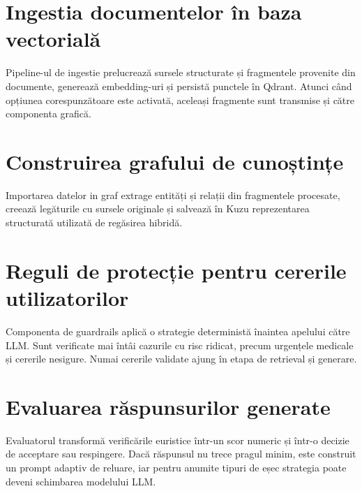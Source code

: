 \documentclass[12pt, a4paper, oneside, romanian]{teza-upb}
\begin{document}
\label{anexa:retrieval-dispatch}


\section{Ingestia documentelor în baza vectorială}

Pipeline-ul de ingestie prelucrează sursele structurate și fragmentele provenite din documente, generează embedding-uri și persistă punctele în Qdrant. Atunci când opțiunea corespunzătoare este activată, aceleași fragmente sunt transmise și către componenta grafică.

\label{anexa:qdrant-ingestion-pipeline}


\section{Construirea grafului de cunoștințe}

 Importarea datelor in graf extrage entități și relații din fragmentele procesate, creează legăturile cu sursele originale și salvează în Kuzu reprezentarea structurată utilizată de regăsirea hibridă.

\label{anexa:graph-ingestion}


\section{Reguli de protecție pentru cererile utilizatorilor}

Componenta de guardrails aplică o strategie deterministă înaintea apelului către LLM. Sunt verificate mai întâi cazurile cu risc ridicat, precum urgențele medicale și cererile nesigure. Numai cererile validate ajung în etapa de retrieval și generare.

\label{anexa:guardrail-rules}


\section{Evaluarea răspunsurilor generate}

Evaluatorul transformă verificările euristice într-un scor numeric și într-o decizie de acceptare sau respingere. Dacă răspunsul nu trece pragul minim, este construit un prompt adaptiv de reluare, iar pentru anumite tipuri de eșec strategia poate deveni schimbarea modelului LLM.
\end{document}
